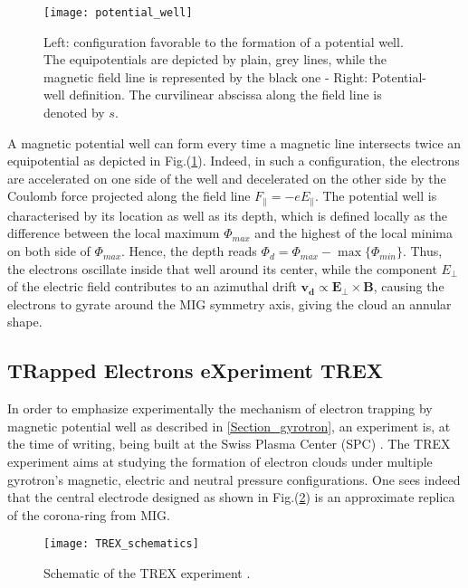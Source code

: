 \begin{figure}[h!]
\centering
	\texttt{[image: potential\_well]}
	\caption{\label{mag_well} Left: configuration favorable to the formation of a potential well. The equipotentials are depicted by plain, grey lines, while the magnetic field line is represented by the black one \cite{Pagonakis} - Right: Potential-well definition. The curvilinear abscissa along the field line is denoted by $s$.}
\end{figure} 


A magnetic potential well can form every time a magnetic line intersects twice an equipotential as depicted in Fig.(\ref{mag_well}). Indeed, in such a configuration, the electrons are accelerated on one side of the well and decelerated on the other side by the Coulomb force projected along the field line $F_{\|} = -eE_{\|}$. The potential well is characterised by its location as well as its depth, which is defined locally as the difference between the local maximum $\Phi_{max}$ and the highest of the local minima on both side of $\Phi_{max}$. Hence, the depth reads $\Phi_d = \Phi_{max} - \max{\{\Phi_{min}\}}$. Thus, the electrons oscillate inside that well around its center, while the component $E_{\perp}$ of the electric field contributes to an azimuthal drift $\mathbf{v_d} \propto \mathbf{E}_{\perp} \times \mathbf{B}$, causing the electrons to gyrate around the MIG symmetry axis, giving the cloud an annular shape.\\

\subsection{TRapped Electrons eXperiment TREX}\label{TREX_Section}

In order to emphasize experimentally the mechanism of electron trapping by magnetic potential well as described in \ref{Section_gyrotron}, an experiment is, at the time of writing, being built at the Swiss Plasma Center (SPC) \cite{TREX}. The TREX experiment aims at studying the formation of electron clouds under multiple gyrotron's magnetic, electric and neutral pressure configurations. One sees indeed that the central electrode designed as shown in Fig.(\ref{TREX_schematics}) is an approximate replica of the corona-ring from MIG. 

\begin{figure}[h!]
\centering
	\texttt{[image: TREX\_schematics]}
	\caption{\label{TREX_schematics} Schematic of the TREX experiment \cite{TREX}.}
\end{figure}  

